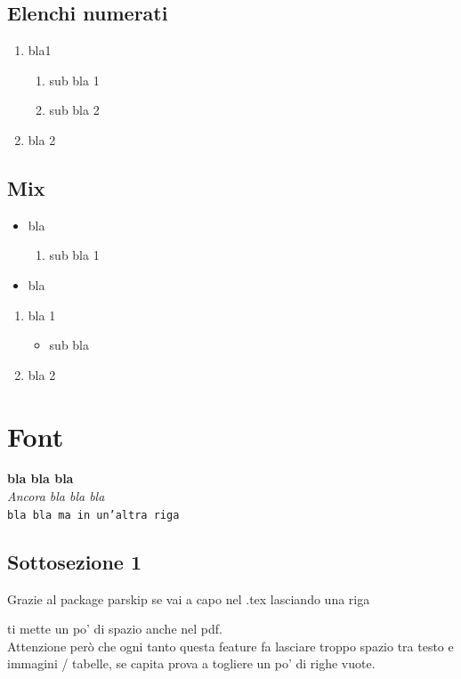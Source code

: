 \documentclass[12pt,a4paper,twoside]{book}
\begin{document}
\subsection{Elenchi numerati}
\begin{enumerate}
    \item bla1
    \begin{enumerate}
        \item sub bla 1
        \item sub bla 2
    \end{enumerate}
    \item bla 2
\end{enumerate}

\subsection{Mix}
\begin{itemize}
    \item bla
    \begin{enumerate}
        \item sub bla 1
    \end{enumerate}
    \item bla
\end{itemize}

\begin{enumerate}
    \item bla 1
    \begin{itemize}
        \item sub bla
    \end{itemize}
    \item bla 2
\end{enumerate}

\section{Font}
\textbf{bla bla bla}\\
\textit{Ancora bla bla bla}\\
\texttt{bla bla ma in un'altra riga}

\subsection{Sottosezione 1}
Grazie al package parskip se vai a capo nel .tex lasciando una riga

ti mette un po' di spazio anche nel pdf.\\
Attenzione però che ogni tanto questa feature fa lasciare troppo spazio tra testo e immagini / tabelle, se capita prova a togliere un po' di righe vuote.
\end{document}
